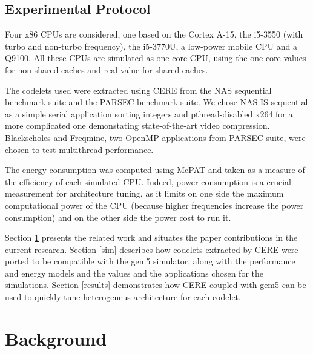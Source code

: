 \documentclass{article}
\begin{document}
\begin{multicols}{2}
\subsection{Experimental Protocol}
Four x86 CPUs are considered, one based on the Cortex A-15\cite{DBLP:conf/samos/EndoCC14}, the i5-3550 (with turbo and non-turbo frequency), the i5-3770U, a low-power mobile CPU and a Q9100. All these CPUs are simulated as one-core CPU, using the one-core values for non-shared caches and real value for shared caches.

The codelets used were extracted using CERE\cite{CERE} from the NAS\cite{NAS} sequential benchmark suite and the PARSEC\cite{PARSEC} benchmark suite. We chose NAS IS sequential as a simple serial application sorting integers and pthread-disabled x264 for a more complicated one demonstating state-of-the-art video compression. Blackscholes and Freqmine, two OpenMP applications from PARSEC suite, were chosen to test multithread performance.


The energy consumption was computed using McPAT\cite{McPAT} and taken as a measure of the efficiency of each simulated CPU. Indeed, power consumption is a crucial measurement for architecture tuning, as it limits on one side the maximum computational power of the CPU (because higher frequencies increase the power consumption) and on the other side the power cost to run it.

Section \ref{bckgrnd} presents the related work and situates the paper contributions in the current research. Section \ref{sim} describes how codelets extracted by CERE were ported to be compatible with the gem5 simulator, along with the performance and energy models and the values and the applications chosen for the simulations. Section \ref{results} demonstrates how CERE coupled with gem5 can be used to quickly tune heterogeneus architecture for each codelet.


\section{Background}
\label{bckgrnd}






\end{multicols}
\end{document}
